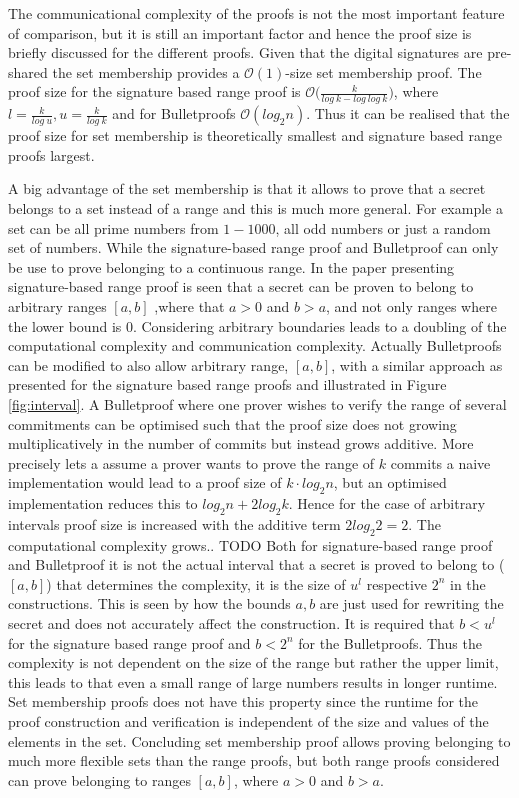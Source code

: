 The communicational complexity of the proofs is not the most important feature of comparison, but it is still an important factor and hence the proof size  is briefly discussed  for the different proofs. Given that the digital signatures are pre-shared the set membership provides a $\mathcal{O}(1)$-size set membership proof. The proof size for the signature based range proof is $\mathcal{O}\big(\frac{k}{log\: k- log\:log\:k}\big)$, where $l = \frac{k}{log\: u}, u = \frac{k}{log\: k}$ and for Bulletproofs $\mathcal{O}(log_2n)$. Thus it can be realised that the proof size for set membership is theoretically smallest and signature based range proofs largest. 

A big advantage of the set membership is that it allows to prove that a secret belongs to a set instead of a range and this is much more general. For example a set can be all prime numbers from $1-1000$, all odd numbers or just a random set of numbers. While the signature-based range proof and Bulletproof can only be use to prove belonging to a continuous range. In the paper presenting signature-based range proof is seen that a secret can be proven to belong to arbitrary ranges $[a,b]$ ,where that $a>0$ and $b>a$, and not only ranges where the lower bound is $0$. Considering arbitrary boundaries leads to a doubling of the computational complexity and communication complexity. Actually Bulletproofs can be modified to also allow arbitrary range, $[a,b]$, with a similar approach as presented for the signature based range proofs and illustrated in Figure \ref{fig:interval}. A Bulletproof where one prover wishes to verify the range of several commitments can be optimised such that the  proof size does not growing multiplicatively in the number of commits but instead grows additive. More precisely lets a assume a prover wants to prove the range of $k$ commits a naive implementation would lead to a proof size of $k\cdot log_2 n $, but an optimised implementation reduces this to $log_2 n + 2 log_2 k$.  Hence for the case of arbitrary intervals  proof size is increased with the additive term $2log_2 2 = 2$. The computational complexity grows.. TODO %
Both for  signature-based range proof  and Bulletproof it is not the actual interval that a secret is proved to belong to ($[a,b]$) that determines the complexity, it is the size of $u^l$ respective $2^n$ in the constructions. This is seen by how the bounds $a,b$ are just used for rewriting the secret and does not accurately affect the construction.
It is required that $b< u^l$ for the signature based range proof and $b<2^n$ for the Bulletproofs. Thus the complexity is not dependent on the size of the range but rather the upper limit, this leads to that even a small range of large numbers results in longer runtime. Set membership proofs does not have this property since the runtime for the proof construction and verification is independent of the size and values of the elements in the set. Concluding set membership proof allows proving belonging to much more flexible sets than the range proofs, but both range proofs considered can prove belonging to ranges $[a,b]$, where $a>0$ and $b>a$. 

